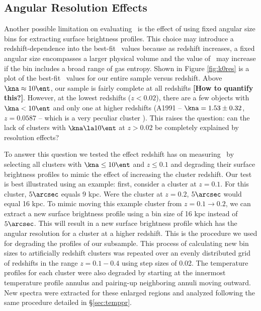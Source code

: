 \documentclass{emulateapj}
\begin{document}
\subsection{Angular Resolution Effects}
\label{sec:angres}

Another possible limitation on evaluating \kna\ is the effect of using
fixed angular size bins for extracting surface brightness
profiles. This choice may introduce a redshift-dependence into the
best-fit \kna\ values because as redshift increases, a fixed angular
size encompasses a larger physical volume and the value of \kna\ may
increase if the bin includes a broad range of gas entropy. Shown in
Figure \ref{fig:k0res} is a plot of the best-fit \kna\ values for our
entire sample versus redshift. Above $\kna \approx 10 \ent$, our
sample is fairly complete at all redshifts {\bf{[How to quantify
      this?]}}. However, at the lowest redshifts ($z < 0.02$), there
are a few objects with $\kna < 10 \ent$ and only one at higher
redshifts (A1991 -- $\kna = 1.53 \pm 0.32$, $z = 0.0587$ -- which is a
very peculiar cluster \citep{2004ApJ...613..180S}). This raises the
question: can the lack of clusters with $\kna \la 10 \ent$ at $z >
0.02$ be completely explained by resolution effects?

To answer this question we tested the effect redshift has on measuring
\kna\ by selecting all clusters with $\kna \leq 10 \ent$ and $z \leq
0.1$ and degrading their surface brightness profiles to mimic the
effect of increasing the cluster redshift. Our test is best
illustrated using an example: first, consider a cluster at $z =
0.1$. For this cluster, $5\arcsec$ equals 9 kpc. Were the cluster at
$z = 0.2$, $5\arcsec$ would equal 16 kpc. To mimic moving this example
cluster from $z = 0.1 \rightarrow 0.2$, we can extract a new surface
brightness profile using a bin size of 16 kpc instead of
$5\arcsec$. This will result in a new surface brightness profile which
has the angular resolution for a cluster at a higher redshift. This is
the procedure we used for degrading the profiles of our
subsample. This process of calculating new bin sizes to artificially
redshift clusters was repeated over an evenly distributed grid of
redshifts in the range $z = 0.1-0.4$ using step sizes of 0.02. The
temperature profiles for each cluster were also degraded by starting
at the innermost temperature profile annulus and pairing-up
neighboring annuli moving outward. New spectra were extracted for
these enlarged regions and analyzed following the same procedure
detailed in \S\ref{sec:temppr}.
\end{document}
